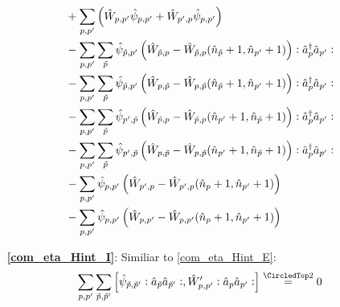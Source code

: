 \begin{appendix}
\begin{itemize}
\begin{align}
&+\sum\limits_{p, p^\prime}\left( \hat W_{ p, p^\prime}\hat \psi_{p,p^\prime}+ \hat W_{p^\prime,p}\hat \psi_{p,p^\prime}\right)\nonumber\\
&- \sum\limits_{p, p^\prime}\sum\limits_{\tilde p}\hat \psi_{\tilde p,p^\prime} \left(\hat W_{ \tilde p,p}-\hat W_{ \tilde p,p}(\hat n_{\tilde p}+1,\hat n_{p^\prime}+1)\right)\vcentcolon\hat a^\dagger_{p}\hat a_{p^\prime}\vcentcolon\nonumber\\
&-\sum\limits_{p, p^\prime}\sum\limits_{\tilde p}\hat \psi_{\tilde p,p^\prime} \left(\hat W_{p,\tilde p}-\hat W_{p,\tilde p}(\hat n_{\tilde p}+1,\hat n_{p^\prime}+1)\right)\vcentcolon\hat a^\dagger_{p}\hat a_{p^\prime}\vcentcolon \nonumber\\
&-\sum\limits_{p, p^\prime}\sum\limits_{\tilde p}\hat \psi_{p^\prime,\tilde p} \left(\hat W_{\tilde p,p}-\hat W_{\tilde p,p}(\hat n_{p^\prime}+1,\hat n_{\tilde p}+1)\right)\vcentcolon\hat a^\dagger_{p}\hat a_{p^\prime}\vcentcolon \nonumber\\
&-\sum\limits_{p, p^\prime}\sum\limits_{\tilde p}\hat \psi_{p^\prime,\tilde p} \left(\hat W_{p, \tilde p}-\hat W_{p, \tilde p}(\hat n_{p^\prime}+1,\hat n_{\tilde p}+1)\right)\vcentcolon\hat a^\dagger_{p}\hat a_{p^\prime}\vcentcolon \nonumber\\
&-\sum\limits_{p, p^\prime}\hat \psi_{p,p^\prime} \left(\hat W_{p^\prime,p}-\hat W_{p^\prime,p}(\hat n_p+1,\hat n_{p^\prime}+1)\right) \nonumber\\
&-\sum\limits_{p, p^\prime}\hat \psi_{p,p^\prime} \left(\hat W_{ p, p^\prime}-\hat W_{ p, p^\prime}(\hat n_p+1,\hat n_{p^\prime}+1)\right)\nonumber
\end{align}
\item[\textbf{\ref{com_eta_Hint_I}}:] Similiar to \ref{com_eta_Hint_E}:
\begin{align} 
\Sum_{p, p^\prime}\Sum_{\tilde p,\tilde p^\prime} \left[\hat\psi_{\tilde p,\tilde p^\prime}\NO\AN_{\tilde p}\AN_{\tilde p^\prime}\NO,\hat W_{p,p^\prime}^\prime\NO\AN_p\AN_{p^\prime}\NO\right]\eqsec 0
\end{align}
\end{itemize}

\end{appendix}
